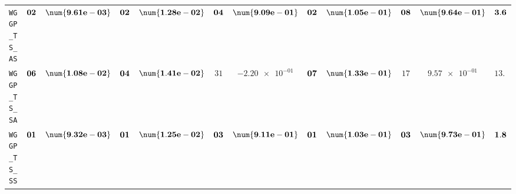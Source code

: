\begin{xltabular}{\textwidth}{l||cC|cC|cC|cC|cC||c}
	\texttt{WGGP\_TS\_AS} & $\bf 02$ & $\bf \num{9.61e-03}$ & $\bf 02$ & $\bf \num{1.28e-02}$ & $\bf 04$ & $\bf \num{9.09e-01}$ & $\bf 02$ & $\bf \num{1.05e-01}$ & $\bf 08$ & $\bf \num{9.64e-01}$ & $\bf 3.6$  \\
	\texttt{WGGP\_TS\_SA} & $\bf 06$ & $\bf \num{1.08e-02}$ & $\bf 04$ & $\bf \num{1.41e-02}$ & $ 31$ & $ \num{-2.20e-01}$ & $\bf 07$ & $\bf \num{1.33e-01}$ & $ 17$ & $ \num{9.57e-01}$ & $ 13.0$  \\
	\texttt{WGGP\_TS\_SS} & $\bf 01$ & $\bf \num{9.32e-03}$ & $\bf 01$ & $\bf \num{1.25e-02}$ & $\bf 03$ & $\bf \num{9.11e-01}$ & $\bf 01$ & $\bf \num{1.03e-01}$ & $\bf 03$ & $\bf \num{9.73e-01}$ & $\bf 1.8$  \\
\end{xltabular}
